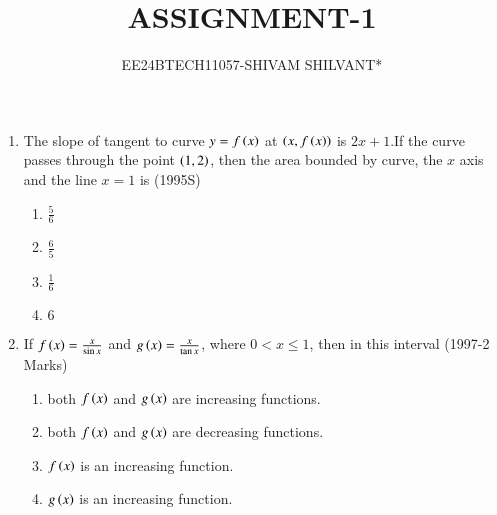 \documentclass[journal,12pt,twocolumn]{IEEEtran}
\theoremstyle{remark}
\begin{document}

\vspace{3cm}

\title{ASSIGNMENT-1}
\author{EE24BTECH11057-SHIVAM SHILVANT*}
\maketitle
\newpage
\bigskip

\renewcommand{\thefigure}{\theenumi}
\renewcommand{\thetable}{\theenumi}
\begin{enumerate}[start=9]
	\item The slope of tangent to curve $y=f\left(x\right)$ at $\left(x,f\left(x\right)\right)$ is $2x + 1$.If the curve passes through the point $\left(1,2\right)$, then the area bounded by curve, the $x$ axis and the line $x=1$ is
\hfill (1995S)
\begin{enumerate}
    \item $\frac{5}{6}$\\ 
    \item $\frac{6}{5}$\\
    \item $\frac{1}{6}$\\ 
    \item $6$\\
\end{enumerate}
\item If $f\left(x\right)=\frac{x}{\sin{x}}$ and $g\left(x\right)=\frac{x}{\tan{x}}$, where $0<x\leq1$, then in this interval
	\hfill (1997-2 Marks)
\begin{enumerate}
	\item both $f\left(x\right)$ and $g\left(x\right)$ are increasing functions.
	\item both $f\left(x\right)$ and $g\left(x\right)$ are decreasing functions.
	\item $f\left(x\right)$ is an increasing function.
        \item $g\left(x\right)$ is an increasing function.\\
\end{enumerate}


\end{enumerate}
\end{document}
